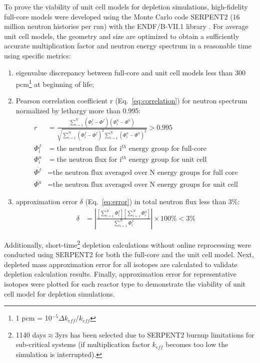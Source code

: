 \documentclass[letterpaper]{mandc2019}
\begin{document}
To prove the viability of unit cell models for depletion simulations, high-fidelity full-core models were developed using the Monte Carlo code SERPENT2 (16 million neutron histories per run) with the ENDF/B-VII.1 library \cite{leppanen_serpent_2015, chadwick_endf/b-vii.1_2011}. For average unit cell models, the geometry and size are optimized to obtain a sufficiently accurate multiplication factor and neutron energy spectrum in a reasonable time using specific metrics:
\vspace{-0.5in}
\begin{enumerate}
	\item eigenvalue discrepancy between full-core and unit cell models less than 300 pcm\footnote{ 1 pcm = 10$^{-5}\Delta k_{eff}/k_{eff}$} at beginning of life;\vspace{-0.11in}
	\item Pearson correlation coefficient r (Eq.~\ref{eq:correlation}) for neutron spectrum normalized by lethargy more than 0.995:
\begin{align}
r &= \frac{\sum_{i=1}^{N} (\Phi_i^f-\overline{\Phi^f})(\Phi_i^u-\overline{\Phi^u})}
		  {\sqrt{\sum_{i=1}^{N} (\Phi_i^f-\overline{\Phi^f})^2 \sum_{i=1}^{N} (\Phi_i^u-\overline{\Phi^u})^2}} > 0.995 \label{eq:correlation} \\
\Phi_i^f &= \mbox{the neutron flux for i$^{th}$ energy group for full-core} \nonumber\\
\Phi_i^u &= \mbox{the neutron flux for i$^{th}$ energy group for unit cell} \nonumber\\
\overline{\Phi^f} &= \mbox{the neutron flux averaged over N energy groups for full core} \nonumber \\
\overline{\Phi^u} &= \mbox{the neutron flux averaged over N energy groups for unit cell} \nonumber
\end{align}	
	\vspace{-0.11in}
	\item approximation error $\delta$ (Eq.~\ref{eq:error})  in total neutron flux less than 3\%:
\begin{align}
\delta &= | \frac{[\sum_{i=1}^{N} \Phi_i^f] [\sum_{i=1}^{N} \Phi_i^u]}
{\sum_{i=1}^{N} \Phi_i^f} | \times 100\% < 3\% \label{eq:error}
\end{align}	
	\vspace{-0.11in}
\end{enumerate}

Additionally, short-time\footnote{1140 days$\approx$3yrs has been selected due to SERPENT2 burnup limitations for sub-critical systems (if multiplication factor $k_{eff}$ becomes too low the simulation is interrupted).} depletion calculations without online reprocessing were conducted using SERPENT2 for both the full-core and the unit cell model. Next, depleted mass approximation error for all isotopes are calculated to validate depletion calculation results. Finally, approximation error for representative isotopes were plotted for each reactor type to demonstrate the viability of unit cell model for depletion simulations.
\end{document}
